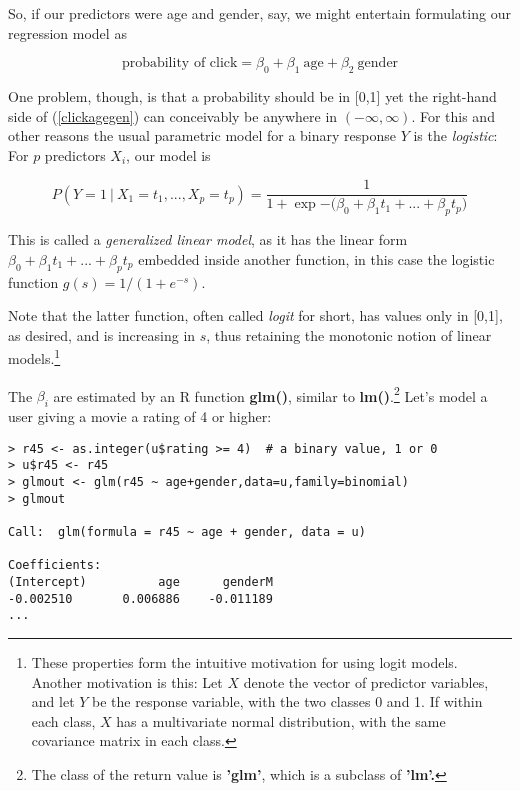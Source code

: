So, if our predictors were age and gender, say, we might entertain
formulating our regression model as

\begin{equation}
\label{clickagegen}
\textrm{probability of click} = \beta_0 + \beta_1 ~ \textrm{age} +
\beta_2 ~ \textrm{gender}
\end{equation}

One problem, though, is that a probability should be in [0,1] yet the
right-hand side of (\ref{clickagegen}) can conceivably be anywhere in
$(-\infty,\infty)$.  For this and other reasons the usual parametric
model for a binary response $Y$ is the \textit{logistic}:  For $p$
predictors $X_i$, our model is

\begin{equation}
P(Y  = 1 ~|~ X_1=t_1,...,X_p=t_p) =
\frac{1}{1+\exp{-(\beta_0+\beta_1 t_1+...+\beta_p t_p})}
\end{equation}

This is called a \textit{generalized linear model}, as it has the linear
form $\beta_0+\beta_1 t_1+...+\beta_p t_p$ embedded inside
another function, in this case the logistic function $g(s) =
1/(1+e^{-s})$.

Note that the latter function, often called \textit{logit} for short,
has values only in [0,1], as desired, and is increasing in $s$, thus
retaining the monotonic notion of linear models.\footnote{These
properties form the intuitive motivation for using logit models.
Another motivation is this: Let $X$ denote the vector of predictor
variables, and let $Y$ be the response variable, with the two classes 0
and 1.  If within each class, $X$ has a multivariate normal
distribution, with the same covariance matrix in each class.}

The $\beta_i$ are estimated by an R function \textbf{glm()}, similar to
\textbf{lm()}.\footnote{The class of the return value is \textbf{'glm'},
which is a subclass of \textbf{'lm'.}
}
Let's model a user giving a movie a rating of 4 or
higher:

\begin{lstlisting}
> r45 <- as.integer(u$rating >= 4)  # a binary value, 1 or 0
> u$r45 <- r45
> glmout <- glm(r45 ~ age+gender,data=u,family=binomial)
> glmout

Call:  glm(formula = r45 ~ age + gender, data = u)

Coefficients:
(Intercept)          age      genderM  
-0.002510       0.006886    -0.011189  
...
\end{lstlisting}


